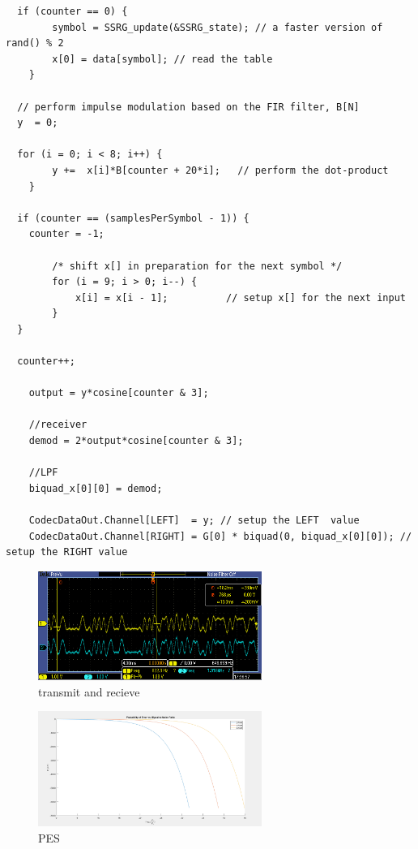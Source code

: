 \documentclass{article}
\begin{document}
\begin{verbatim}
  if (counter == 0) {
		symbol = SSRG_update(&SSRG_state); // a faster version of rand() % 2
		x[0] = data[symbol]; // read the table
	}

  // perform impulse modulation based on the FIR filter, B[N] 
  y  = 0;

  for (i = 0; i < 8; i++) {
		y +=  x[i]*B[counter + 20*i];	// perform the dot-product
	}

  if (counter == (samplesPerSymbol - 1)) {
    counter = -1; 

		/* shift x[] in preparation for the next symbol */
 		for (i = 9; i > 0; i--) {
			x[i] = x[i - 1];          // setup x[] for the next input
		}
  }

  counter++;

	output = y*cosine[counter & 3];

	//receiver
	demod = 2*output*cosine[counter & 3];

	//LPF
	biquad_x[0][0] = demod;

	CodecDataOut.Channel[LEFT]  = y; // setup the LEFT  value
	CodecDataOut.Channel[RIGHT] = G[0] * biquad(0, biquad_x[0][0]); // setup the RIGHT value
\end{verbatim}

\begin{figure}[h]
  \begin{center}
    \includegraphics[width=0.65\textwidth]{img/tx_rx.png}
    \caption{transmit and recieve}
  \end{center}
\end{figure}

\begin{figure}[h]
  \begin{center}
    \includegraphics[width=0.65\textwidth]{img/probability_of_error.png}
    \caption{PES}
  \end{center}
\end{figure}
\end{document}
